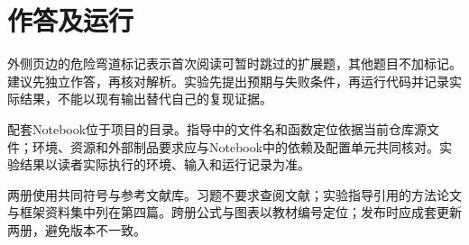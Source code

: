 \section*{作答及运行}
\optional 外侧页边的危险弯道标记表示首次阅读可暂时跳过的扩展题，其他题目不加标记。建议先独立作答，再核对解析。实验先提出预期与失败条件，再运行代码并记录实际结果，不能以现有输出替代自己的复现证据。

配套Notebook位于项目的目录。指导中的文件名和函数定位依据当前仓库源文件；环境、资源和外部制品要求应与Notebook中的依赖及配置单元共同核对。实验结果以读者实际执行的环境、输入和运行记录为准。

两册使用共同符号与参考文献库。习题不要求查阅文献；实验指导引用的方法论文与框架资料集中列在第四篇。跨册公式与图表以教材编号定位；发布时应成套更新两册，避免版本不一致。

